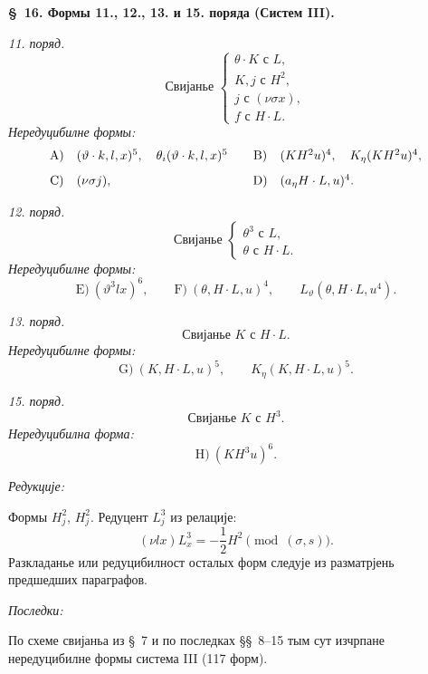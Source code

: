 ﻿\documentclass[11pt]{article}
\begin{document}
\begin{center}
\textbf{\S\ 16. \quad Формы 11., 12., 13. и 15. поряда (Систем III).}
\end{center}

\noindent\textit{11. поряд.}
\[
\text{Свијанье }\left\{\begin{array}{l}
\theta\cdot K \text{ с }L,\\
K,j \text{ с }H^2,\\
j \text{ с }(\nu\sigma x),\\
f \text{ с }H\cdot L.
\end{array}\right.
\]
\noindent\textit{Нередуцибилне формы:}
\[
\begin{array}{c@{\quad}l@{\qquad}c@{\quad}l}
\mathrm{A)}&(\vartheta\cdot k,l,x)^5,\quad
\theta_i(\vartheta\cdot k,l,x)^5&
\mathrm{B)}&(KH^2u)^4,\quad K_\eta(KH^2u)^4,\\[0.8em]
\mathrm{C)}&(\nu\sigma j),&
\mathrm{D)}&(a_\eta H\cdot L,u)^4.
\end{array}
\]

\noindent\textit{12. поряд.}
\[
\text{Свијанье }\left\{\begin{array}{l}
\theta^3 \text{ с }L,\\
\theta \text{ с }H\cdot L.
\end{array}\right.
\]
\noindent\textit{Нередуцибилне формы:}
\[
\mathrm{E)}\ (\vartheta^3lx)^6,
\qquad
\mathrm{F)}\ (\theta,H\cdot L,u)^4,
\qquad L_\vartheta(\theta,H\cdot L,u^4).
\]

\noindent\textit{13. поряд.}
\[
\text{Свијанье }K\text{ с }H\cdot L.
\]
\noindent\textit{Нередуцибилне формы:}
\[
\mathrm{G)}\ (K,H\cdot L,u)^5,
\qquad K_\eta(K,H\cdot L,u)^5.
\]

\noindent\textit{15. поряд.}
\[
\text{Свијанье }K\text{ с }H^3.
\]
\noindent\textit{Нередуцибилна форма:}
\[
\mathrm{H)}\ (KH^3u)^6.
\]

\noindent\textit{Редукције:}

Формы $H_j^2$, $H_j^2$. Редуцент $L_j^3$ из релације:
\[
(\nu lx)L_x^3=-\frac12H^2\pmod{(\sigma,s)}.
\]
Разкладанье или редуцибилност осталых форм следује из разматрјень предшедших параграфов.

\noindent\textit{Последки:}

По схеме свијаньа из \S\ 7 и по последках \S\S\ 8--15 тым сут изчрпане нередуцибилне формы система III (117 форм).
\end{document}
